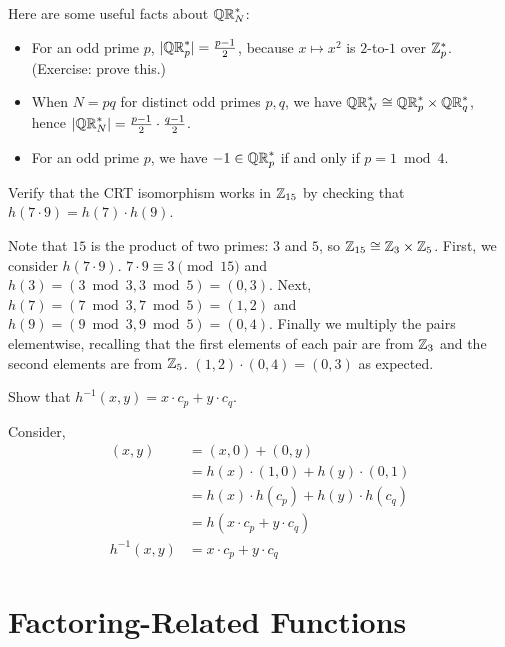\documentclass[11pt]{article}
\begin{document}
\noindent Here are some useful facts about $\mathbb{QR}_{N}^{*}$:
\begin{itemize}
\item For an odd prime $p$, $\lvert\mathbb{QR}_{p}^{*}\rvert = \frac{p-1}{2}$, because
  $x \mapsto x^{2}$ is $2$-to-$1$ over $\mathbb{Z}_p^{*}$.  (Exercise: prove
  this.)

\item When $N = pq$ for distinct odd primes $p,q$, we have $\mathbb{QR}_{N}^{*}
  \cong \mathbb{QR}_{p}^{*} \times \mathbb{QR}_{q}^{*}$, hence $\lvert\mathbb{QR}_{N}^{*}\rvert =
  \frac{p-1}{2} \cdot \frac{q-1}{2}$.

\item For an odd prime $p$, we have $-1 \in \mathbb{QR}_{p}^{*}$ if and only if
  $p = 1 \bmod 4$.
\end{itemize}

\begin{question}
    Verify that the CRT isomorphism works in $\mathbb{Z}_{15}$ by checking that $h(7 \cdot 9) = h(7) \cdot h(9)$.
\end{question}
\begin{answer}
    Note that $15$ is the product of two primes: $3$ and $5$, so \(\mathbb{Z}_{15} \cong \mathbb{Z}_3
    \times \mathbb{Z}_5\).  First, we consider \(h(7 \cdot 9)\). \(7 \cdot 9 \equiv 3 \pmod{15}\)
    and \(h(3) = (3 \bmod 3, 3 \bmod 5) = (0, 3)\). Next, \(h(7) = (7 \bmod{3}, 7
    \bmod{5}) = (1,2)\) and \(h(9) = (9 \bmod{3}, 9 \bmod 5) = (0, 4)\). Finally we
    multiply the pairs elementwise, recalling that the first elements of each pair are
    from \(\mathbb{Z}_3\) and the second elements are from \(\mathbb{Z}_5\).  \((1,2) \cdot (0,4) =
    (0,3)\) as expected.
\end{answer}
\begin{question}
    Show that \(h^{-1}(x,y) = x \cdot c_p + y \cdot c_q\).
\end{question}
\begin{answer}
    Consider,
    \begin{align*}
        (x,y) &= (x, 0) + (0, y) \\
              &= h(x) \cdot (1,0) + h(y) \cdot (0,1) \\
              &= h(x) \cdot h(c_p) + h(y) \cdot h(c_q) \\
              &= h(x \cdot c_p + y \cdot c_q) \\
        h^{-1}(x,y) &= x \cdot c_p + y \cdot c_q
    \end{align*}
\end{answer}



\section{Factoring-Related Functions}
\label{sec:fact-related}
\end{document}
